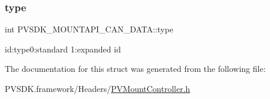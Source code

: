 \subsubsection{\texorpdfstring{type}{type}}
{\footnotesize\ttfamily int P\+V\+S\+D\+K\+\_\+\+M\+O\+U\+N\+T\+A\+P\+I\+\_\+\+C\+A\+N\+\_\+\+D\+A\+T\+A\+::type}



id\+:type0\+:standard 1\+:expanded id 



The documentation for this struct was generated from the following file\+:\begin{DoxyCompactItemize}
\item 
P\+V\+S\+D\+K.\+framework/\+Headers/\hyperlink{_p_v_mount_controller_8h}{P\+V\+Mount\+Controller.\+h}\end{DoxyCompactItemize}
